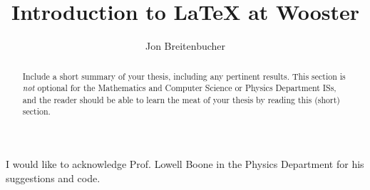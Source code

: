 \documentclass[10pt,code,picins,kaukecopyright,openright,woolshort,dropcaps,verbatim,euler,index,colophon,blacklinks,twoside]{woosterthesis}
\title{Introduction to \LaTeX{} at Wooster}
\author{Jon Breitenbucher}
\begin{document}

\frontmatter
\maketitle
\ClearShipoutPicture
\clearpage\thispagestyle{empty}\null\clearpage
\disscopyright 

%                                                                                       
%                                                                                       

\begin{abstract}
Include a short summary of your thesis, including any pertinent results.  This section is \emph{not} optional for the Mathematics and Computer Science or Physics Department ISs, and the reader should be able to learn the meat of your thesis by reading this (short) section.
\end{abstract}

%                                                                                       
%                                                                                       

\dedication{This work is dedicated to the future generations of Wooster students.}


%                                                                                       
%                                                                                       

\begin{acknowl}  
I would like to acknowledge Prof. Lowell Boone in the Physics Department for his suggestions and code.
\end{acknowl}
\end{document}

